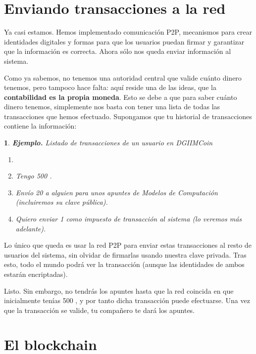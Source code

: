 \documentclass[10pt, a4paper]{article}
\newcommand\dout{\bgroup \markoverwith{\rule[0.2ex]{0.1pt}{0.4pt}\rule[0.8ex]{0.1pt}{0.4pt}}\ULon}
\def\dout{\bgroup
 \markoverwith{\lower-0.35ex\hbox
 {\kern-.03em\vbox{\hrule width.2em\kern0.45ex\hrule}\kern-.03em}}%
 \ULon}
\theoremstyle{theorem-style}
\newtheorem*{datos}{}
\theoremstyle{theorem-style}
\theoremstyle{definition-style}
\theoremstyle{remark-style}
\theoremstyle{example-style}
\theoremstyle{definition-style}
\theoremstyle{remark-style}
\begin{document}
\section{Enviando transacciones a la
red}\label{enviando-transacciones-a-la-red}

Ya casi estamos. Hemos implementado comunicación P2P, mecanismos para
crear identidades digitales y formas para que los usuarios puedan firmar
y garantizar que la información es correcta. Ahora sólo nos queda enviar
información al sistema.

Como ya sabemos, no tenemos una autoridad central que valide cuánto
dinero tenemos, pero tampoco hace falta: aquí reside una de las ideas,
que la \textbf{contabilidad es la propia moneda}. Esto se debe a que
para saber cuánto dinero tenemos, simplemente nos basta con tener una
lista de todas las transacciones que hemos efectuado. Supongamos que tu
historial de transacciones contiene la información:

\begin{datos}
{\sffamily \textbf{Ejemplo.} Listado de transacciones de un usuario en \emph{DGIIMCoin}}\\
\begin{enumerate}
\def\labelenumi{\arabic{enumi}.}
\itemsep1pt\parskip0pt
\vspace{-1.2cm}
\item[]
	\hspace{1cm}
\item
  Tengo 500\dout{D}.
\item
  Envío 20\dout{D} a alguien para unos apuntes de Modelos de
  Computación (incluiremos su clave pública).
\item
  Quiero enviar 1\dout{D} como impuesto de transacción al sistema (lo
  veremos más adelante).
\end{enumerate}
\end{datos}

Lo único que queda es usar la red P2P para enviar estas transacciones al
resto de usuarios del sistema, sin olvidar de firmarlas usando nuestra
clave privada. Tras esto, todo el mundo podrá ver la transacción (aunque las identidades de ambos estarán encriptadas).

Listo. Sin embargo, no tendrás los apuntes hasta que la red coincida en
que inicialmente tenías 500\dout{D}, y por tanto dicha transacción
puede efectuarse. Una vez que la transacción se valide, tu compañero te
dará los apuntes.

\section{El blockchain}\label{el-blockchain}
\end{document}
